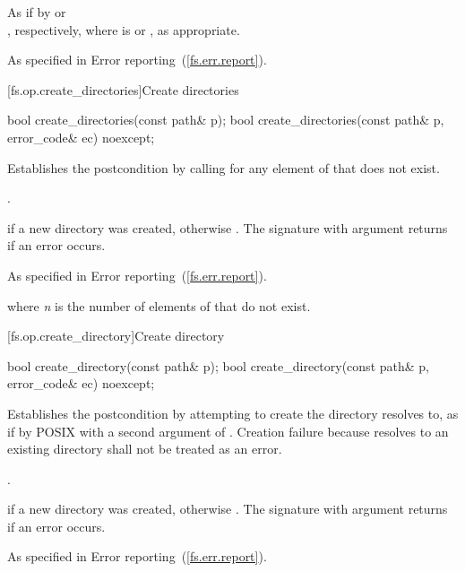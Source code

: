 \begin{itemdescr}
\pnum
\effects As if by
 or\\
, respectively,
  where  is  or
  , as appropriate.

\pnum
\throws As specified in Error reporting~(\ref{fs.err.report}).
\end{itemdescr}


[fs.op.create_directories]{Create directories}

\begin{itemdecl}
bool create_directories(const path& p);
bool create_directories(const path& p, error_code& ec) noexcept;
\end{itemdecl}

\begin{itemdescr}
\pnum
\effects Establishes the postcondition by calling  for any element of  that does not
  exist.

\pnum
\postcondition {}.

\pnum
\returns {} if a new directory was created, otherwise . The signature with argument  returns  if an
  error occurs.

\pnum
\throws As specified in Error reporting~(\ref{fs.err.report}).

\pnum
\complexity {} where \textit{n} is the number of elements
  of  that do not exist.
\end{itemdescr}


[fs.op.create_directory]{Create directory}

\begin{itemdecl}
bool create_directory(const path& p);
bool create_directory(const path& p, error_code& ec) noexcept;
\end{itemdecl}

\begin{itemdescr}
\pnum
\effects Establishes the postcondition by attempting to create the
  directory  resolves to, as if by POSIX  with a second argument of
  . Creation
  failure because  resolves to an existing directory shall not be
  treated as an error.

\pnum
\postcondition {}.

\pnum
\returns {} if a new directory was created, otherwise .
  The signature with argument  returns  if an error occurs.

\pnum
\throws As specified in Error reporting~(\ref{fs.err.report}).
\end{itemdescr}

